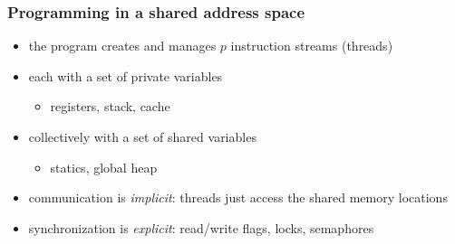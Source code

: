 \begin{frame}[fragile]
%
  \frametitle{Programming in a shared address space}
%
  \begin{itemize}
%
  \item the program creates and manages $p$ instruction streams (threads)
  \item each with a set of private variables
    \begin{itemize}
      \item registers, stack, cache
    \end{itemize}
%
  \item collectively with a set of shared variables
    \begin{itemize}
      \item statics, global heap
    \end{itemize}
%
  \item communication is {\em implicit}: threads just access the shared memory locations
  \item synchronization is {\em explicit}: read/write flags, locks, semaphores
%
  \end{itemize}
%
\end{frame}

